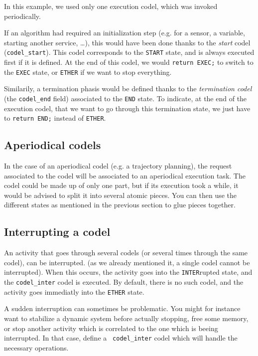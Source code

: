 In this example,   we used only  one execution  codel, which  was invoked
periodically.

If an algorithm had required an  initialization step (e.g.  for a sensor,
a variable, starting another service, \ldots), this  would have been done
thanks to the {\em start} codel ({\tt codel\_start}).  This codel
corresponds to the {\tt START} state, and  is always executed first if it
is  defined. At the  end  of this codel,  we  would {\tt return EXEC;} to
switch to  the {\tt  EXEC} state, or   {\tt ETHER} if   we  want to  stop
everything.

Similarily, a termination phasis   would be defined   thanks to the  {\em
termination codel} (the {\tt codel\_end} field) associated to the
{\tt END} state. To indicate, at the end of  the execution codel, that we
want to go through this  termination state, we just  have to {\tt  return
END;} instead of {\tt ETHER}.


\subsection{Aperiodical codels}

In  the case of  an aperiodical codel (e.g.   a trajectory planning), the
request associated  to the codel  will be  associated to  an  aperiodical
execution task. The codel  could be made up of  only one part, but if its
execution took  a while,  it  would be advised  to  split it into several
atomic pieces.  You can then use the different states as mentioned in the
previous section to glue pieces together.


\subsection{Interrupting a codel}

An activity that  goes through several  codels (or  several times through
the  same codel), can  be  interrupted.  (as  we already  mentioned it, a
single codel cannot be interrupted). When  this occurs, the activity goes
into the  {\tt INTER}rupted  state,  and the  {\tt  codel\_inter}
codel is executed.  By default, there is  no such codel, and the activity
goes immediatly into the {\tt ETHER} state.

A  sudden  interruption can   sometimes  be problematic.  You  might  for
instance  want  to stabilize a dynamic   system before actually stopping,
free some memory, or stop another activity which is correlated to the one
which   is  beeing     interrupted.  In   that  case,   define    a  {\tt
codel\_inter} codel which will handle the necessary operations.


